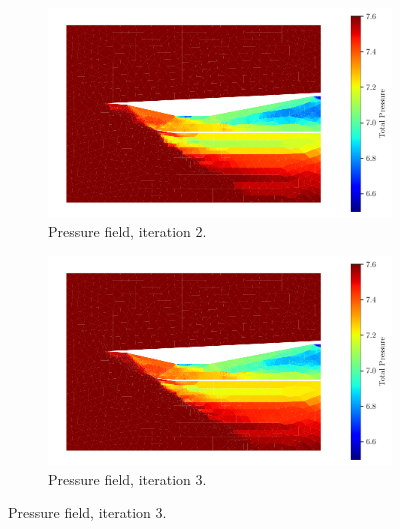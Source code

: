 \begin{figure}[h!]
    \begin{subfigure}[h]{0.49\linewidth}
        \centering
        \includegraphics[width=\linewidth]{rep/q4/Pfield2.pdf}
        \caption{Pressure field, iteration 2.}
    \end{subfigure}
    \begin{subfigure}[h]{0.49\linewidth}
        \centering
        \includegraphics[width=\linewidth]{rep/q4/Pfield3.pdf}
        \caption{Pressure field, iteration 3.}
    \end{subfigure}


\end{figure}

